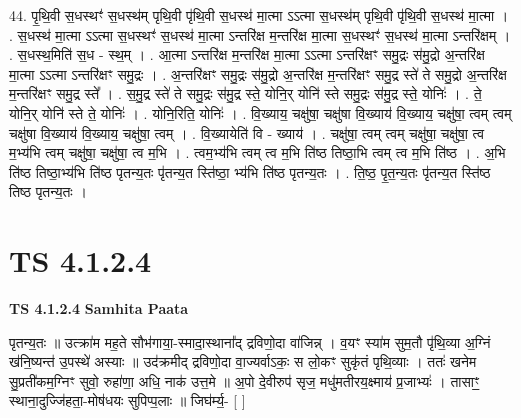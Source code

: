 \documentclass[17pt]{extarticle}
\begin{document}
44. पृ॒थि॒वी स॒धस्थꣳ॑ स॒धस्थ॑म् पृथि॒वी पृ॑थि॒वी स॒धस्थ॑ मा॒त्मा ऽऽत्मा स॒धस्थ॑म् पृथि॒वी पृ॑थि॒वी स॒धस्थ॑ मा॒त्मा । . स॒धस्थ॑ मा॒त्मा ऽऽत्मा स॒धस्थꣳ॑ स॒धस्थ॑ मा॒त्मा ऽन्तरि॑क्ष म॒न्तरि॑क्ष मा॒त्मा स॒धस्थꣳ॑ स॒धस्थ॑ मा॒त्मा ऽन्तरि॑क्षम् । . स॒धस्थ॒मिति॑ स॒ध - स्थ॒म् । . आ॒त्मा ऽन्तरि॑क्ष म॒न्तरि॑क्ष मा॒त्मा ऽऽत्मा ऽन्तरि॑क्षꣳ समु॒द्रः स॑मु॒द्रो अ॒न्तरि॑क्ष मा॒त्मा ऽऽत्मा ऽन्तरि॑क्षꣳ समु॒द्रः । . अ॒न्तरि॑क्षꣳ समु॒द्रः स॑मु॒द्रो अ॒न्तरि॑क्ष म॒न्तरि॑क्षꣳ समु॒द्र स्ते॑ ते समु॒द्रो अ॒न्तरि॑क्ष म॒न्तरि॑क्षꣳ समु॒द्र स्ते᳚ । . स॒मु॒द्र स्ते॑ ते समु॒द्रः स॑मु॒द्र स्ते॒ योनि॒र् योनि॑ स्ते समु॒द्रः स॑मु॒द्र स्ते॒ योनिः॑ । . ते॒ योनि॒र् योनि॑ स्ते ते॒ योनिः॑ । . योनि॒रिति॒ योनिः॑ । . वि॒ख्याय॒ चक्षु॑षा॒ चक्षु॑षा वि॒ख्याय॑ वि॒ख्याय॒ चक्षु॑षा॒ त्वम् त्वम् चक्षु॑षा वि॒ख्याय॑ वि॒ख्याय॒ चक्षु॑षा॒ त्वम् । . वि॒ख्यायेति॑ वि - ख्याय॑ । . चक्षु॑षा॒ त्वम् त्वम् चक्षु॑षा॒ चक्षु॑षा॒ त्व म॒भ्य॑भि त्वम् चक्षु॑षा॒ चक्षु॑षा॒ त्व म॒भि । . त्वम॒भ्य॑भि त्वम् त्व म॒भि ति॑ष्ठ तिष्ठा॒भि त्वम् त्व म॒भि ति॑ष्ठ । . अ॒भि ति॑ष्ठ तिष्ठा॒भ्य॑भि ति॑ष्ठ पृतन्य॒तः पृ॑तन्य॒त स्ति॑ष्ठा॒ भ्य॑भि ति॑ष्ठ पृतन्य॒तः । . ति॒ष्ठ॒ पृ॒त॒न्य॒तः पृ॑तन्य॒त स्ति॑ष्ठ तिष्ठ पृतन्य॒तः । \newline
\pagebreak
{}

\section{ TS 4.1.2.4 }

\textbf{TS 4.1.2.4 } \newline
\textbf{Samhita Paata} \newline

पृतन्य॒तः ॥ उत्क्रा॑म मह॒ते सौभ॑गाया॒-स्मादा॒स्थाना᳚द् द्रविणो॒दा वा॑जिन्न् । व॒यꣳ स्या॑म सुम॒तौ पृ॑थि॒व्या अ॒ग्निं ख॑नि॒ष्यन्त॑ उ॒पस्थे॑ अस्याः ॥ उद॑क्रमीद् द्रविणो॒दा वा॒ज्यर्वाऽकः॒ स लो॒कꣳ सुकृ॑तं पृथि॒व्याः । ततः॑ खनेम सु॒प्रती॑कम॒ग्निꣳ सुवो॒ रुहा॑णा॒ अधि॒ नाक॑ उत्त॒मे ॥ अ॒पो दे॒वीरुप॑ सृज॒ मधु॑मतीरय॒क्ष्माय॑ प्र॒जाभ्यः॑ । तासाꣳ॒॒ स्थाना॒दुज्जि॑हता॒-मोष॑धयः सुपिप्प॒लाः ॥ जिघ॑र्म्य॒- [  ] \newline
\end{document}
